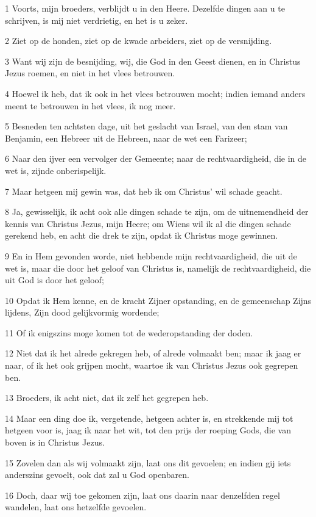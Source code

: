 \par 1 Voorts, mijn broeders, verblijdt u in den Heere. Dezelfde dingen aan u te schrijven, is mij niet verdrietig, en het is u zeker.
\par 2 Ziet op de honden, ziet op de kwade arbeiders, ziet op de versnijding.
\par 3 Want wij zijn de besnijding, wij, die God in den Geest dienen, en in Christus Jezus roemen, en niet in het vlees betrouwen.
\par 4 Hoewel ik heb, dat ik ook in het vlees betrouwen mocht; indien iemand anders meent te betrouwen in het vlees, ik nog meer.
\par 5 Besneden ten achtsten dage, uit het geslacht van Israel, van den stam van Benjamin, een Hebreer uit de Hebreen, naar de wet een Farizeer;
\par 6 Naar den ijver een vervolger der Gemeente; naar de rechtvaardigheid, die in de wet is, zijnde onberispelijk.
\par 7 Maar hetgeen mij gewin was, dat heb ik om Christus' wil schade geacht.
\par 8 Ja, gewisselijk, ik acht ook alle dingen schade te zijn, om de uitnemendheid der kennis van Christus Jezus, mijn Heere; om Wiens wil ik al die dingen schade gerekend heb, en acht die drek te zijn, opdat ik Christus moge gewinnen.
\par 9 En in Hem gevonden worde, niet hebbende mijn rechtvaardigheid, die uit de wet is, maar die door het geloof van Christus is, namelijk de rechtvaardigheid, die uit God is door het geloof;
\par 10 Opdat ik Hem kenne, en de kracht Zijner opstanding, en de gemeenschap Zijns lijdens, Zijn dood gelijkvormig wordende;
\par 11 Of ik enigszins moge komen tot de wederopstanding der doden.
\par 12 Niet dat ik het alrede gekregen heb, of alrede volmaakt ben; maar ik jaag er naar, of ik het ook grijpen mocht, waartoe ik van Christus Jezus ook gegrepen ben.
\par 13 Broeders, ik acht niet, dat ik zelf het gegrepen heb.
\par 14 Maar een ding doe ik, vergetende, hetgeen achter is, en strekkende mij tot hetgeen voor is, jaag ik naar het wit, tot den prijs der roeping Gods, die van boven is in Christus Jezus.
\par 15 Zovelen dan als wij volmaakt zijn, laat ons dit gevoelen; en indien gij iets anderszins gevoelt, ook dat zal u God openbaren.
\par 16 Doch, daar wij toe gekomen zijn, laat ons daarin naar denzelfden regel wandelen, laat ons hetzelfde gevoelen.
